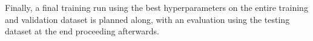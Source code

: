 \documentclass[11pt]{article}
\begin{document}
Finally, a final training run using the best hyperparameters on the entire training and validation dataset is planned along, with an evaluation using the testing dataset at the end proceeding afterwards.









\end{document}
